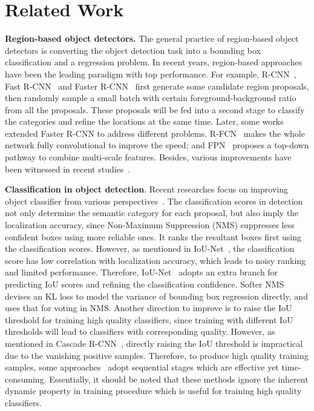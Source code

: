 \documentclass[runningheads]{llncs}
\begin{document}
\section{Related Work}

\textbf{Region-based object detectors.}
The general practice of region-based object detectors is converting the object detection task into a bounding box classification and a regression problem. In recent years, region-based approaches have been the leading paradigm with top performance. For example, R-CNN~\cite{RCNN}, Fast R-CNN~\cite{FastRCNN} and Faster R-CNN~\cite{FasterRCNN} first generate some candidate region proposals, then randomly sample a small batch with certain foreground-background ratio from all the proposals. These proposals will be fed into a second stage to classify the categories and refine the locations at the same time. Later, some works extended Faster R-CNN to address different problems. R-FCN~\cite{R-FCN} makes the whole network fully convolutional to improve the speed; and FPN~\cite{FPN} proposes a top-down pathway to combine multi-scale features. Besides, various improvements have been witnessed in recent studies~\cite{Speed-Accuracy-Tradeoff,GuidedAnchor,TridentNet,DetNet,DCNv2}.

\noindent
\textbf{Classification in object detection}.
Recent researches focus on improving object classifier from various perspectives~\cite{FocalLoss,IoUNet,LibraRCNN,LTR,NoisyAnchors,ATSS,DCR,KL-Loss}.
The classification scores in detection not only determine the semantic category for each proposal, but also imply the localization accuracy,
since Non-Maximum Suppression (NMS) suppresses less confident boxes using more reliable ones. It ranks the resultant boxes first using the classification scores.
However, as mentioned in IoU-Net~\cite{IoUNet}, the classification score has low correlation with localization accuracy, which leads to noisy ranking and limited performance. Therefore, IoU-Net~\cite{IoUNet} adopts an extra branch for predicting IoU scores and refining the classification confidence. Softer NMS~\cite{KL-Loss} devises an KL loss to model the variance of bounding box regression directly, and uses that for voting in NMS.
Another direction to improve is to raise the IoU threshold for training high quality classifiers, since training with different IoU thresholds will lead to classifiers with corresponding quality. However, as mentioned in Cascade R-CNN~\cite{CascadeRCNN}, directly raising the IoU threshold is impractical due to the vanishing positive samples. Therefore, to produce high quality training samples, some approaches~\cite{CascadeRCNN,CascadeRetinaNet} adopt sequential stages which are effective yet time-consuming. Essentially, it should be noted that these methods ignore the inherent dynamic property in training procedure which is useful for training high quality classifiers.
\end{document}
